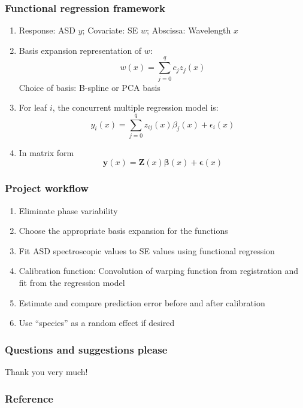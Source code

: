 \documentclass[10pt,dvipsnames,table]{beamer}
\begin{document}
\begin{frame}
\frametitle{Functional regression framework}
\begin{enumerate}
\item Response: ASD $y$; Covariate: SE $w$; Abscissa: Wavelength $x$
\item Basis expansion representation of $w$:
\[w(x) = \sum \limits_{j=0}^{q} c_j z_j(x)\]
Choice of basis: B-spline or PCA basis
\item For leaf $i$, the concurrent multiple regression model is:
\[ y_i(x) = \sum \limits_{j=0}^{q} z_{ij}(x)\beta_j(x) + \epsilon_i(x) \]
\item In matrix form
\[ \mathbf{y}(x) = \mathbf{Z}(x)\mathbf{\beta}(x) + \mathbf{\epsilon}(x)\]
\end{enumerate}
\end{frame}

\begin{frame}
\frametitle{Project workflow}
\begin{enumerate}
\item Eliminate phase variability
\item Choose the appropriate basis expansion for the functions
\item Fit ASD spectroscopic values to SE values using functional regression
\item Calibration function: Convolution of warping function from registration and fit from the regression model
\item Estimate and compare prediction error before and after calibration 
\item Use ``species'' as a random effect if desired
\end{enumerate}
\end{frame}

\begin{frame}
\frametitle{Questions and suggestions please}

Thank you very much!

\end{frame}

\begin{frame}
\frametitle{Reference}
{\footnotesize{
    
    
}}
\end{frame}
\end{document}

